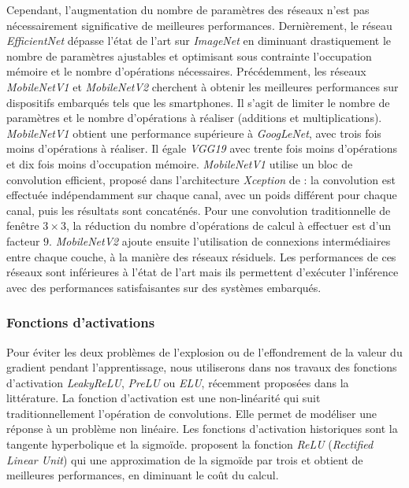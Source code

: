 Cependant, l'augmentation du nombre de paramètres des réseaux n'est pas nécessairement significative de meilleures performances.
Dernièrement, le réseau \textit{EfficientNet} dépasse l'état de l'art sur \textit{ImageNet} en diminuant drastiquement le nombre de paramètres ajustables et optimisant sous contrainte l'occupation mémoire et le nombre d'opérations nécessaires.
Précédemment, les réseaux \textit{MobileNetV1} \cite{howard_mobilenets_2017} et \textit{MobileNetV2} \cite{sandler_mobilenetv2_2018} cherchent à obtenir les meilleures performances sur dispositifs embarqués tels que les smartphones.
Il s'agit de limiter le nombre de paramètres et le nombre d'opérations à réaliser (additions et multiplications).
\textit{MobileNetV1} obtient une performance supérieure à \textit{GoogLeNet}, avec trois fois moins d'opérations à réaliser.
Il égale \textit{VGG19} avec trente fois moins d'opérations et dix fois moins d'occupation mémoire.
\textit{MobileNetV1} utilise un bloc de convolution efficient, proposé dans l'architecture \textit{Xception} de \citeauthor{chollet_xception_2016} \cite{chollet_xception_2016} : la convolution est effectuée indépendamment sur chaque canal, avec un poids différent pour chaque canal, puis les résultats sont concaténés.
Pour une convolution traditionnelle de fenêtre $3 \times 3$, la réduction du nombre d'opérations de calcul à effectuer est d'un facteur $9$.
\textit{MobileNetV2} ajoute ensuite l'utilisation de connexions intermédiaires entre chaque couche, à la manière des réseaux résiduels.
Les performances de ces réseaux sont inférieures à l'état de l'art mais ils permettent d'exécuter l'inférence avec des performances satisfaisantes sur des systèmes embarqués.

\subsubsection{Fonctions d'activations} \label{subsubsec:activation}
Pour éviter les deux problèmes de l'explosion ou de l'effondrement de la valeur du gradient pendant l'apprentissage, nous utiliserons dans nos travaux des fonctions d'activation \textit{LeakyReLU}, \textit{PreLU} ou \textit{ELU}, récemment proposées dans la littérature.
La fonction d'activation est une non-linéarité qui suit traditionnellement l'opération de convolutions.
Elle permet de modéliser une réponse à un problème non linéaire.
Les fonctions d'activation historiques sont la tangente hyperbolique et la sigmoïde.
\citeauthor{nair_rectified_2010} \cite{nair_rectified_2010} proposent la fonction \textit{ReLU} (\textit{Rectified Linear Unit}) qui une approximation de la sigmoïde par trois et obtient de meilleures performances, en diminuant le coût du calcul.

